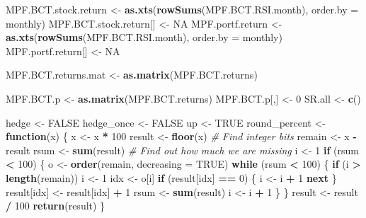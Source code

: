 \documentclass[
]{article}
\newenvironment{Shaded}{\begin{snugshade}}{\end{snugshade}}
\newcommand{\CommentTok}[1]{\textcolor[rgb]{0.56,0.35,0.01}{\textit{#1}}}
\newcommand{\ControlFlowTok}[1]{\textcolor[rgb]{0.13,0.29,0.53}{\textbf{#1}}}
\newcommand{\DataTypeTok}[1]{\textcolor[rgb]{0.13,0.29,0.53}{#1}}
\newcommand{\DecValTok}[1]{\textcolor[rgb]{0.00,0.00,0.81}{#1}}
\newcommand{\KeywordTok}[1]{\textcolor[rgb]{0.13,0.29,0.53}{\textbf{#1}}}
\newcommand{\NormalTok}[1]{#1}
\newcommand{\OperatorTok}[1]{\textcolor[rgb]{0.81,0.36,0.00}{\textbf{#1}}}
\newcommand{\OtherTok}[1]{\textcolor[rgb]{0.56,0.35,0.01}{#1}}
\newcommand{\StringTok}[1]{\textcolor[rgb]{0.31,0.60,0.02}{#1}}
\begin{document}
\begin{Shaded}
\begin{Highlighting}[]
\NormalTok{MPF.BCT.stock.return <-}
\StringTok{  }\KeywordTok{as.xts}\NormalTok{(}\KeywordTok{rowSums}\NormalTok{(MPF.BCT.RSI.month), }\DataTypeTok{order.by =}\NormalTok{ monthly)}
\NormalTok{MPF.BCT.stock.return[] <-}\StringTok{ }\OtherTok{NA}
\NormalTok{MPF.portf.return <-}
\StringTok{  }\KeywordTok{as.xts}\NormalTok{(}\KeywordTok{rowSums}\NormalTok{(MPF.BCT.RSI.month), }\DataTypeTok{order.by =}\NormalTok{ monthly)}
\NormalTok{MPF.portf.return[] <-}\StringTok{ }\OtherTok{NA}


\NormalTok{MPF.BCT.returns.mat <-}\StringTok{ }\KeywordTok{as.matrix}\NormalTok{(MPF.BCT.returns)}

\NormalTok{MPF.BCT.p <-}\StringTok{ }\KeywordTok{as.matrix}\NormalTok{(MPF.BCT.returns)}
\NormalTok{MPF.BCT.p[,] <-}\StringTok{ }\DecValTok{0}
\NormalTok{SR.all <-}\StringTok{ }\KeywordTok{c}\NormalTok{()}


\NormalTok{hedge <-}\StringTok{ }\OtherTok{FALSE}
\NormalTok{hedge_once <-}\StringTok{ }\OtherTok{FALSE}
\NormalTok{up <-}\StringTok{ }\OtherTok{TRUE}
\NormalTok{round_percent <-}\StringTok{ }\ControlFlowTok{function}\NormalTok{(x) \{}
\NormalTok{  x <-}\StringTok{ }\NormalTok{x }\OperatorTok{*}\StringTok{ }\DecValTok{100}
\NormalTok{  result <-}\StringTok{ }\KeywordTok{floor}\NormalTok{(x)    }\CommentTok{# Find integer bits}
\NormalTok{  remain <-}\StringTok{ }\NormalTok{x }\OperatorTok{-}\StringTok{ }\NormalTok{result}
\NormalTok{  rsum <-}\StringTok{ }\KeywordTok{sum}\NormalTok{(result)   }\CommentTok{# Find out how much we are missing}
\NormalTok{  i <-}\StringTok{ }\DecValTok{1}
  \ControlFlowTok{if}\NormalTok{ (rsum }\OperatorTok{<}\StringTok{ }\DecValTok{100}\NormalTok{) \{}
\NormalTok{    o <-}\StringTok{ }\KeywordTok{order}\NormalTok{(remain, }\DataTypeTok{decreasing =} \OtherTok{TRUE}\NormalTok{)}
    \ControlFlowTok{while}\NormalTok{ (rsum }\OperatorTok{<}\StringTok{ }\DecValTok{100}\NormalTok{) \{}
      \ControlFlowTok{if}\NormalTok{ (i }\OperatorTok{>}\StringTok{ }\KeywordTok{length}\NormalTok{(remain))}
\NormalTok{        i <-}\StringTok{ }\DecValTok{1}
\NormalTok{      idx <-}\StringTok{ }\NormalTok{o[i]}
      \ControlFlowTok{if}\NormalTok{ (result[idx] }\OperatorTok{==}\StringTok{ }\DecValTok{0}\NormalTok{) \{}
\NormalTok{        i <-}\StringTok{ }\NormalTok{i }\OperatorTok{+}\StringTok{ }\DecValTok{1}
        \ControlFlowTok{next}
\NormalTok{      \}}
\NormalTok{      result[idx] <-}\StringTok{ }\NormalTok{result[idx] }\OperatorTok{+}\StringTok{ }\DecValTok{1}
\NormalTok{      rsum <-}\StringTok{ }\KeywordTok{sum}\NormalTok{(result)}
\NormalTok{      i <-}\StringTok{ }\NormalTok{i }\OperatorTok{+}\StringTok{ }\DecValTok{1}
\NormalTok{    \}}
\NormalTok{  \}}
\NormalTok{  result <-}\StringTok{ }\NormalTok{result }\OperatorTok{/}\StringTok{ }\DecValTok{100}
  \KeywordTok{return}\NormalTok{(result)}
\NormalTok{\}}



\end{Highlighting}
\end{Shaded}
\end{document}
